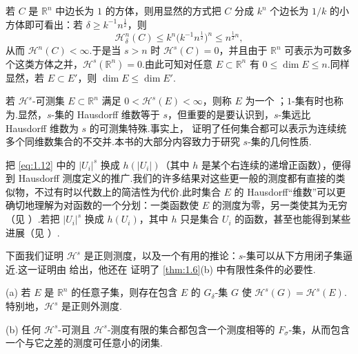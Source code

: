 若 $C$ 是 $\mathbb{R}^n$ 中边长为 $1$ 的方体，则用显然的方式把 $C$ 分成 $k^n$ 个边长为 $1/k$ 的小方体即可看出：若 $\delta\geq k^{-1}n^{\frac{1}{2}}$，则
\[
  \mathcal{H}^n_{\delta}(C)\leq k^{n}\bigl(k^{-1}n^{\frac{1}{2}}\bigr)^{n}\leq n^{\frac{1}{2}n},
\]
从而 $\mathcal{H}^n(C)<\infty$.于是当 $s>n$ 时 $\mathcal{H}^s(C)=0$，并且由于 $\mathbb{R}^n$ 可表示为可数多个这类方体之并，$\mathcal{H}^s(\mathbb{R}^n)=0$.由此可知对任意 $E\subset\mathbb{R}^n$ 有 $0\leq\dim E\leq n$.同样显然，若 $E\subset E'$，则 $\dim E\leq\dim E'$.

若 $\mathcal{H}^s$-可测集 $E\subset\mathbb{R}^n$ 满足 $0<\mathcal{H}^s(E)<\infty$，则称 $E$ 为一个 ；$1$-集有时也称为.显然，$s$-集的 Hausdorff 维数等于 $s$，但重要的是要认识到，$s$-集远比 Hausdorff 维数为 $s$ 的可测集特殊.事实上，\textcite{besicovitch1942} 证明了任何集合都可以表示为连续统多个同维数集合的不交并.本书的大部分内容致力于研究 $s$-集的几何性质.

把 \eqref{eq:1.12} 中的 $|U_i|^s$ 换成 $h(|U_i|)$（其中 $h$ 是某个右连续的递增正函数），便得到 Hausdorff 测度定义的推广.我们的许多结果对这些更一般的测度都有直接的类似物，不过有时以代数上的简洁性为代价.此时集合 $E$ 的 Hausdorff``维数''可以更确切地理解为对函数的一个分划：一类函数使 $E$ 的测度为零，另一类使其为无穷（见 \textcite{rogers1970}）.若把 $|U_i|^s$ 换成 $h(U_i)$，其中 $h$ 只是集合 $U_i$ 的函数，甚至也能得到某些进展（见 \textcites{davies1969,daviessamuels1974}）.

下面我们证明 $\mathcal{H}^s$ 是正则测度，以及一个有用的推论：$s$-集可以从下方用闭子集逼近.这一证明由 \textcite{besicovitch1938} 给出，他还在 \citeyear{besicovitch1954} 证明了 \cref{thm:1.6}(b) 中有限性条件的必要性.

\begin{theorem}\label{thm:1.6}
(a) 若 $E$ 是 $\mathbb{R}^n$ 的任意子集，则存在包含 $E$ 的 $G_{\delta}$-集 $G$ 使 $\mathcal{H}^s(G)=\mathcal{H}^s(E)$.特别地，$\mathcal{H}^s$ 是正则外测度.

(b) 任何 $\mathcal{H}^s$-可测且 $\mathcal{H}^s$-测度有限的集合都包含一个测度相等的 $F_{\sigma}$-集，从而包含一个与它之差的测度可任意小的闭集.
\end{theorem}


